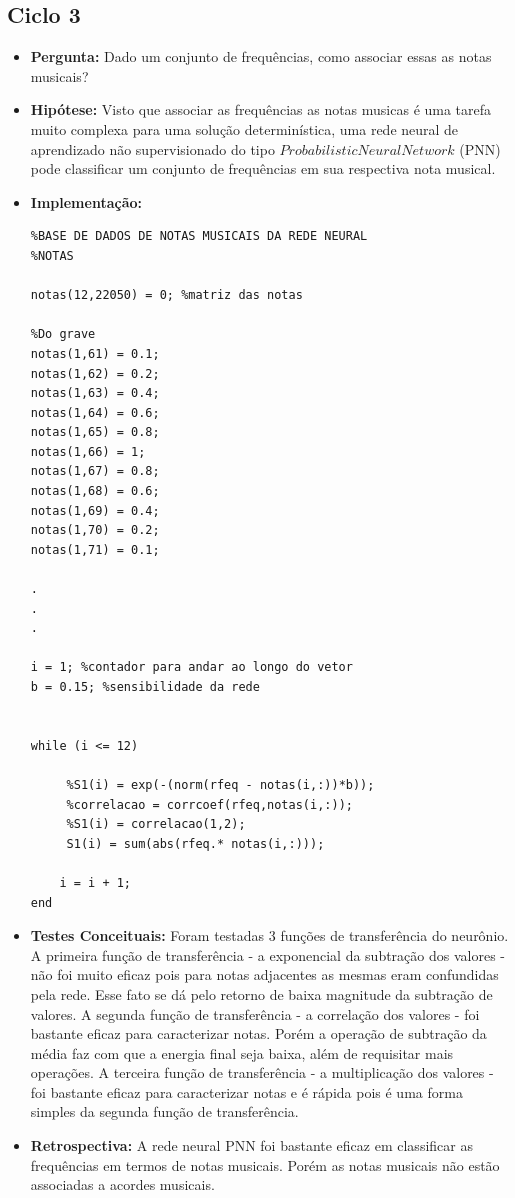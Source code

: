 \subsection{Ciclo 3}
\begin{itemize}
\item \textbf{Pergunta:} Dado um conjunto de frequências, como associar essas as notas musicais?
\item \textbf{Hipótese:} Visto que associar as frequências as notas musicas é uma tarefa muito complexa para uma solução determinística, uma rede neural de aprendizado não supervisionado do tipo $Probabilistic Neural Network$ (PNN) pode classificar um conjunto de frequências em sua respectiva nota musical.
\item \textbf{Implementação:} 
\begin{lstlisting}
%BASE DE DADOS DE NOTAS MUSICAIS DA REDE NEURAL
%NOTAS

notas(12,22050) = 0; %matriz das notas

%Do grave
notas(1,61) = 0.1;
notas(1,62) = 0.2;
notas(1,63) = 0.4;
notas(1,64) = 0.6;
notas(1,65) = 0.8;
notas(1,66) = 1;
notas(1,67) = 0.8;
notas(1,68) = 0.6;
notas(1,69) = 0.4;
notas(1,70) = 0.2;
notas(1,71) = 0.1;

.
.
.

i = 1; %contador para andar ao longo do vetor
b = 0.15; %sensibilidade da rede


while (i <= 12)
    
     %S1(i) = exp(-(norm(rfeq - notas(i,:))*b));
     %correlacao = corrcoef(rfeq,notas(i,:));
     %S1(i) = correlacao(1,2);    
     S1(i) = sum(abs(rfeq.* notas(i,:)));

    i = i + 1;
end

\end{lstlisting}
\item \textbf{Testes Conceituais:} Foram testadas 3 funções de transferência do neurônio. A primeira função de transferência - a exponencial da subtração dos valores - não foi muito eficaz pois para notas adjacentes as mesmas eram confundidas pela rede. Esse fato se dá pelo retorno de baixa magnitude da subtração de valores. A segunda função de transferência - a correlação dos valores - foi bastante eficaz para caracterizar notas. Porém a operação de subtração da média faz com que a energia final seja baixa, além de requisitar mais operações. A terceira função de transferência - a multiplicação dos valores - foi bastante eficaz para caracterizar notas e é rápida pois é uma forma simples da segunda função de transferência.
\item \textbf{Retrospectiva:} A rede neural PNN foi bastante eficaz em classificar as frequências em termos de notas musicais. Porém as notas musicais não estão associadas a acordes musicais.
\end{itemize}

